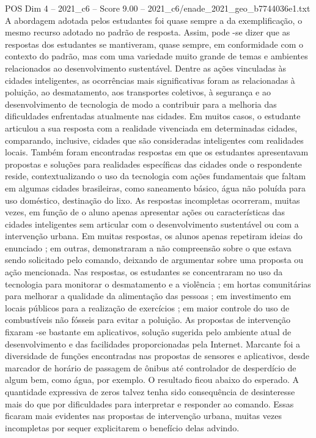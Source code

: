 \begin{textsample}{POS Dim 4 – 2021\_c6 – Score 9.00 – 2021\_c6/enade\_2021\_geo\_b7744036e1.txt}
A abordagem adotada pelos estudantes foi quase sempre a da exemplificação, o mesmo recurso adotado no padrão de resposta.
Assim, pode -se dizer que as respostas dos estudantes se mantiveram, quase sempre, em conformidade com o contexto do padrão, mas com uma variedade muito grande de temas e ambientes relacionados ao desenvolvimento sustentável.
Dentre as ações vinculadas às cidades inteligentes, as ocorrências mais significativas foram as relacionadas à poluição, ao desmatamento, aos transportes coletivos, à segurança e ao desenvolvimento de tecnologia de modo a contribuir para a melhoria das dificuldades enfrentadas atualmente nas cidades.
Em muitos casos, o estudante articulou a sua resposta com a realidade vivenciada em determinadas cidades, comparando, inclusive, cidades que são consideradas inteligentes com realidades locais.
Também foram encontradas respostas em que os estudantes apresentavam propostas e soluções para realidades específicas das cidades onde o respondente reside, contextualizando o uso da tecnologia com ações fundamentais que faltam em algumas cidades brasileiras, como saneamento básico, água não poluída para uso doméstico, destinação do lixo.
As respostas incompletas ocorreram, muitas vezes, em função de o aluno apenas apresentar ações ou características das cidades inteligentes sem articular com o desenvolvimento sustentável ou com a intervenção urbana.
Em muitas respostas, os alunos apenas repetiram ideias do enunciado ; em outras, demonstraram a não compreensão sobre o que estava sendo solicitado pelo comando, deixando de argumentar sobre uma proposta ou ação mencionada.
Nas respostas, os estudantes se concentraram no uso da tecnologia para monitorar o desmatamento e a violência ; em hortas comunitárias para melhorar a qualidade da alimentação das pessoas ; em investimento em locais públicos para a realização de exercícios ; em maior controle do uso de combustíveis não fósseis para evitar a poluição.
As propostas de intervenção fixaram -se bastante em aplicativos, solução sugerida pelo ambiente atual de desenvolvimento e das facilidades proporcionadas pela Internet.
Marcante foi a diversidade de funções encontradas nas propostas de sensores e aplicativos, desde marcador de horário de passagem de ônibus até controlador de desperdício de algum bem, como água, por exemplo.
O resultado ficou abaixo do esperado.
A quantidade expressiva de zeros talvez tenha sido consequência de desinteresse mais do que por dificuldades para interpretar e responder ao comando.
Essas ficaram mais evidentes nas propostas de intervenção urbana, muitas vezes incompletas por sequer explicitarem o benefício delas advindo.

\end{textsample}
